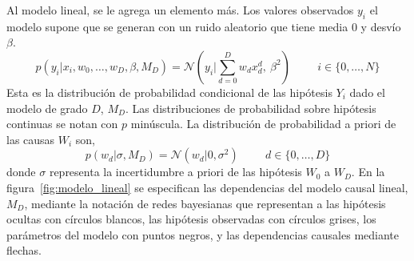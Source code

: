 \documentclass[a4paper,11pt]{book}
\newcommand{\N}{\mathcal{N}}
\theoremstyle{definition}
\begin{document}

Al modelo lineal, se le agrega un elemento m\'as.
%
Los valores observados $y_i$ el modelo supone que se generan con un ruido aleatorio que tiene media 0 y desv\'io $\beta$.
%
\begin{equation} \label{eq:likelihood_modelo_lineal}
p(y_i|x_i, w_0, \dots, w_D, \beta, M_D) = \N(y_i| \sum_{d = 0}^{D} w_d x_d^d,\ \beta^2) \hspace{1cm} \text{$i \in \{0,\dots, N\}$}
\end{equation}
%
Esta es la distribuci\'on de probabilidad condicional de las hip\'otesis $Y_i$ dado el modelo de grado $D$, $M_D$.
%
Las distribuciones de probabilidad sobre hip\'otesis continuas se notan con $p$ min\'uscula.
%
La distribuci\'on de probabilidad a priori de las causas $W_i$ son,
%
\begin{equation} \label{eq:prior_modelo_lineal}
p(w_d|\sigma,M_D) = \N(w_d|0, \sigma^2) \hspace{1cm} \text{$d \in \{0,\dots,D\}$}
\end{equation}
%
donde $\sigma$ representa la incertidumbre a priori de las hip\'otesis $W_0$ a $W_D$.
%
En la figura~\ref{fig:modelo_lineal} se especifican las dependencias del modelo causal lineal, $M_D$, mediante la notaci\'on de redes bayesianas que representan a las hip\'otesis ocultas con c\'irculos blancos, las hip\'otesis observadas con c\'irculos grises, los par\'ametros del modelo con puntos negros, y las dependencias causales mediante flechas.

\end{document}
